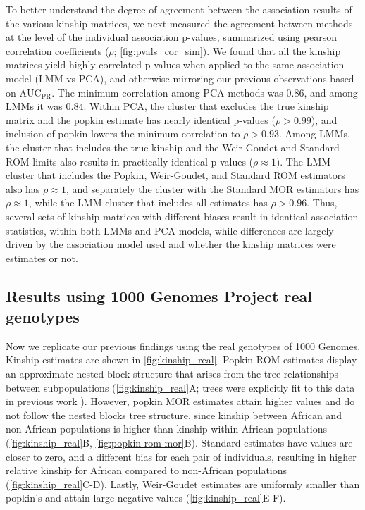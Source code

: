 \documentclass[11pt]{article}
\newcommand{\auc}{\text{AUC}_\text{PR}}
\begin{document}
To better understand the degree of agreement between the association results of the various kinship matrices, we next measured the agreement between methods at the level of the individual association p-values, summarized using pearson correlation coefficients ($\rho$; \cref{fig:pvals_cor_sim}).
We found that all the kinship matrices yield highly correlated p-values when applied to the same association model (LMM vs PCA), and otherwise mirroring our previous observations based on $\auc$.
The minimum correlation among PCA methods was $0.86$, and among LMMs it was $0.84$.
Within PCA, the cluster that excludes the true kinship matrix and the popkin estimate has nearly identical p-values ($\rho > 0.99$), and inclusion of popkin lowers the minimum correlation to $\rho > 0.93$.
Among LMMs, the cluster that includes the true kinship and the Weir-Goudet and Standard ROM limits also results in practically identical p-values ($\rho \approx 1$).
The LMM cluster that includes the Popkin, Weir-Goudet, and Standard ROM estimators also has $\rho \approx 1$, and separately the cluster with the Standard MOR estimators has $\rho \approx 1$, while the LMM cluster that includes all estimates has $\rho > 0.96$.
Thus, several sets of kinship matrices with different biases result in identical association statistics, within both LMMs and PCA models, while differences are largely driven by the association model used and whether the kinship matrices were estimates or not.

\subsection{Results using 1000 Genomes Project real genotypes}

Now we replicate our previous findings using the real genotypes of 1000 Genomes.
Kinship estimates are shown in \cref{fig:kinship_real}.
Popkin ROM estimates display an approximate nested block structure that arises from the tree relationships between subpopulations (\cref{fig:kinship_real}A; trees were explicitly fit to this data in previous work \citep{yao_limitations_2022}).
However, popkin MOR estimates attain higher values and do not follow the nested blocks tree structure, since kinship between African and non-African populations is higher than kinship within African populations (\cref{fig:kinship_real}B, \cref{fig:popkin-rom-mor}B).
Standard estimates have values are closer to zero, and a different bias for each pair of individuals, resulting in higher relative kinship for African compared to non-African populations (\cref{fig:kinship_real}C-D).
Lastly, Weir-Goudet estimates are uniformly smaller than popkin's and attain large negative values (\cref{fig:kinship_real}E-F).
\end{document}
